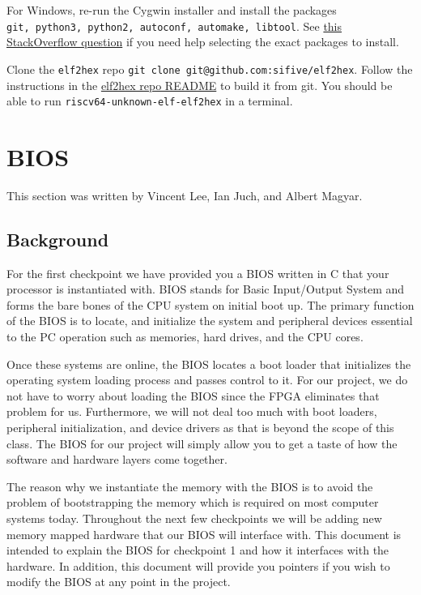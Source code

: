 \documentclass[11pt]{article}
\begin{document}
For Windows, re-run the Cygwin installer and install the packages\\\verb|git, python3, python2, autoconf, automake, libtool|.
See \href{https://stackoverflow.com/questions/47168311/cygwin-and-failed-to-run-aclocal-no-such-file-or-directory}{this StackOverflow question} if you need help selecting the exact packages to install.

Clone the \verb|elf2hex| repo \verb|git clone git@github.com:sifive/elf2hex|.
Follow the instructions in the \href{https://github.com/sifive/elf2hex}{elf2hex repo README} to build it from git.
You should be able to run \verb|riscv64-unknown-elf-elf2hex| in a terminal.

\section{BIOS}
\label{sec:biosinfo}
This section was written by Vincent Lee, Ian Juch, and Albert Magyar.

\subsection{Background}
For the first checkpoint we have provided you a BIOS written in C that your processor is
instantiated with. BIOS stands for Basic Input/Output System and forms the bare bones of the
CPU system on initial boot up. The primary function of the BIOS is to locate, and initialize the
system and peripheral devices essential to the PC operation such as memories, hard drives, and
the CPU cores.

Once these systems are online, the BIOS locates a boot loader that initializes the operating
system loading process and passes control to it. For our project, we do not have to worry about
loading the BIOS since the FPGA eliminates that problem for us. Furthermore, we will not deal
too much with boot loaders, peripheral initialization, and device drivers as that is beyond the
scope of this class. The BIOS for our project will simply allow you to get a taste of how the
software and hardware layers come together.

The reason why we instantiate the memory with the BIOS is to avoid the problem of
bootstrapping the memory which is required on most computer systems today. Throughout the
next few checkpoints we will be adding new memory mapped hardware that our BIOS will
interface with. This document is intended to explain the BIOS for checkpoint 1 and how it
interfaces with the hardware. In addition, this document will provide you pointers if you wish to
modify the BIOS at any point in the project.
\end{document}

